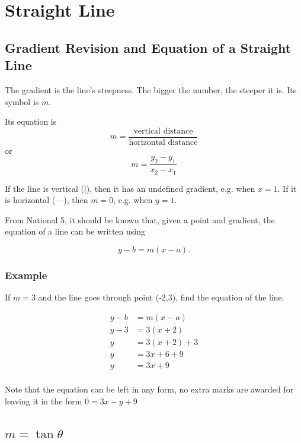 \chapter{Straight Line}


\section{Gradient Revision and Equation of a Straight Line}
The gradient is the line's steepness. The bigger the number, the steeper it is. Its symbol is $m$.

Its equation is
\begin{equation*}
m = \frac{\text{vertical distance}}{\text{horizontal distance}}
\end{equation*}
or
\begin{equation}
m = \frac{y_2-y_1}{x_2-x_1}
\end{equation}

If the line is vertical ($\vert$), then it has an undefined gradient, e.g. when $x=1$. If it is horizontal (—), then $m=0$, e.g. when $y=1$.

From National 5, it should be known that, given a point and gradient, the equation of a line can be written using

\begin{equation}
y-b=m(x-a).
\end{equation}

\subsection{Example}
If $m=3$ and the line goes through point (-2,3), find the equation of the line.

\begin{align*}
y-b&=m(x-a)\\
y-3&=3(x+2)\\
y&=3(x+2)+3\\
y&=3x+6+9\\
y&=3x+9\\
\end{align*}

Note that the equation can be left in any form, no extra marks are awarded for leaving it in the form $0 = 3x - y + 9$


\section{$m=\tan\theta$}

